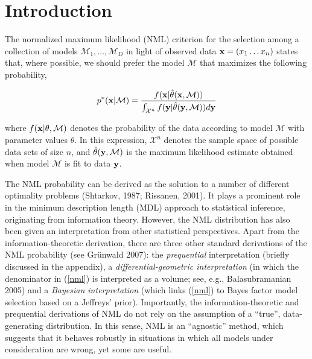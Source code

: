 \documentclass[authoryear]{elsarticle}
\newcommand{\sectionX}[1]{\section{#1}}
\newcommand{\condon}{|}
\newcommand{\model}{\mathcal{M}}
\newcommand{\sspace}[2]{\mathcal{#1}^{#2}}
\newcommand{\vx}{\ensuremath{{\bf x}}}
\newcommand{\vy}{\ensuremath{{\bf y}}}
\begin{document}
\newpage
\sectionX{Introduction}

The normalized maximum likelihood (NML) criterion for the selection
among a collection of models $\model_1, \ldots, \model_D$ in light of
observed data $\vx =(x_1 \ldots x_n)$ states that, where possible, we
should prefer the model $\model$ that maximizes the following
probability,

\vspace*{-12pt}
\begin{equation} \label{nml}
p^*(\vx \condon \model) =\frac{f(\vx \condon \hat{\theta}(\vx,\model))}
{ \int_{\mathcal{X}^n} f(\vy \condon \hat{\theta}(\vy,\model)) d\vy}
\end{equation}

where $f(\vx \condon \theta, \model)$ denotes the probability of the
data according to model $\model$ with parameter values $\theta$. In
this expression, $\sspace{X}{n}$ denotes the sample space of possible
data sets of size $n$, and $\hat{\theta}(\vy,\model)$ is the maximum
likelihood estimate obtained when model $\model$ is fit to data $\vy$.

The NML probability can be derived as the solution to a number of
different optimality problems (Shtarkov, 1987; Rissanen, 2001).  It
plays a prominent role in the minimum description length (MDL)
approach to statistical inference, originating from information
theory. However, the NML distribution has also been given an
interpretation from other statistical perspectives. Apart from the
information-theoretic derivation, there are three other standard
derivations of the NML probability (see Gr\"unwald 2007): the {\em
  prequential\/} interpretation (briefly discussed in the appendix), a
{\em differential-geometric interpretation\/} (in which the
denominator in (\ref{nml}) is interpreted as a volume; see, e.g.,
Balasubramanian 2005) and a {\em Bayesian interpretation}\/ (which
links (\ref{nml}) to Bayes factor model selection based on a Jeffreys'
prior). Importantly, the information-theoretic and prequential
derivations of NML do not rely on the assumption of a ``true'',
data-generating distribution. In this sense, NML is an ``agnostic''
method, which suggests that it behaves robustly in situations in which
all models under consideration are wrong, yet some are useful.
\end{document}
